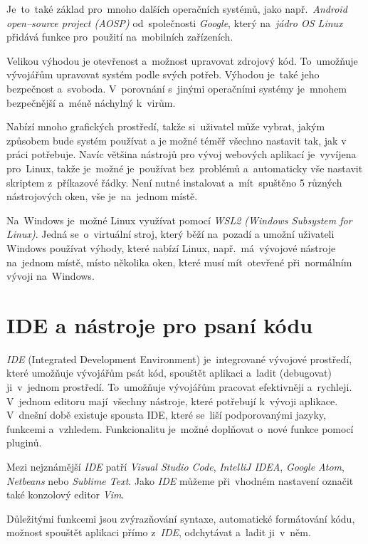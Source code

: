 \documentclass[11pt,a4paper]{report}
\begin{document}
            Je~to~také základ pro~mnoho dalších operačních systémů, jako např.~\emph{Android \emph{open--source} project (\emph{AOSP})} od~společnosti \emph{Google}, který na~\emph{jádro OS Linux} přidává funkce pro~použití na~mobilních zařízeních. \cite{AOSP:linux}
            
            Velikou výhodou je otevřenost a~možnost upravovat zdrojový kód. To~umožňuje vývojářům upravovat systém podle svých potřeb. Výhodou je~také jeho bezpečnost a~svoboda. V~porovnání s~jinými operačními systémy je~mnohem bezpečnější a~méně náchylný k~virům. \cite{medium:LinuxSecure}

            Nabízí mnoho grafických prostředí, takže si~uživatel může vybrat, jakým způsobem bude systém používat a je možné téměř
            všechno nastavit tak, jak v práci potřebuje. Navíc většina nástrojů pro vývoj webových aplikací je~vyvíjena pro~Linux, takže je~možné je~používat bez~problémů a~automaticky vše nastavit skriptem z~příkazové řádky. Není nutné instalovat a~mít~spuštěno 5 různých nástrojových oken, vše je~na~jednom místě.

            Na~Windows je~možné Linux využívat pomocí \emph{WSL2 (Windows Subsystem for Linux)}. Jedná se~o~virtuální stroj, který běží na~pozadí a umožní uživateli Windows používat výhody, které nabízí Linux, např.~má~vývojové nástroje na~jednom místě, místo několika oken, které musí mít~otevřené při~normálním vývoji na~Windows.

        \section{IDE a nástroje pro psaní kódu}
            \emph{IDE} (Integrated Development Environment) je~integrované vývojové prostředí, které umožňuje vývojářům psát kód, spouštět aplikaci a~ladit (debugovat) ji~v~jednom prostředí. To~umožňuje vývojářům pracovat efektivněji a~rychleji. V~jednom editoru mají~všechny nástroje, které potřebují k~vývoji aplikace. V~dnešní době existuje spousta IDE, které se~liší podporovanými jazyky, funkcemi a~vzhledem. Funkcionalitu je~možné doplňovat o~nové funkce pomocí pluginů.
            
            Mezi nejznámější \emph{IDE} patří \emph{Visual Studio Code}, \emph{IntelliJ IDEA}, \emph{Google Atom}, \emph{Netbeans} nebo \emph{Sublime Text}. Jako \emph{IDE} můžeme při~vhodném nastavení označit také konzolový editor \emph{Vim}.
            
            Důležitými funkcemi jsou zvýrazňování syntaxe, automatické formátování kódu, možnost spouštět aplikaci přímo z~\emph{IDE}, odchytávat a~ladit ji~v~něm. \cite{IDE}
            
\end{document}
